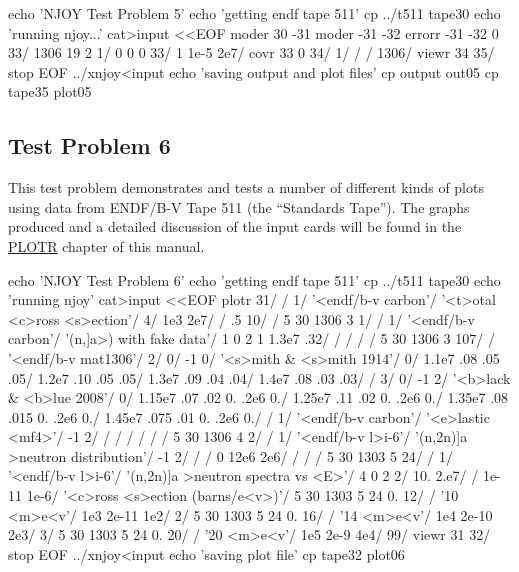 \small
\begin{ccode}

echo 'NJOY Test Problem 5'
echo 'getting endf tape 511'
cp ../t511 tape30
echo 'running njoy...'
cat>input <<EOF
 moder
 30 -31
 moder
 -31 -32
 errorr
 -31 -32 0 33/
 1306 19 2 1/
 0 0
 0 33/
 1
 1e-5 2e7/
 covr
 33 0 34/
 1/
 /
 /
 1306/
 viewr
 34 35/
 stop
EOF
../xnjoy<input
echo 'saving output and plot files'
cp output out05
cp tape35 plot05

\end{ccode}
\normalsize

\subsection{Test Problem 6}
\label{ssMandT_6}

This test problem demonstrates and tests a number of different
kinds of plots using data from ENDF/B-V Tape 511
(the ``Standards Tape'').  The graphs produced and a detailed
discussion of the input cards will be found in the
\hyperlink{sPLOTRhy}{PLOTR}
chapter of this manual.

\small
\begin{ccode}

echo 'NJOY Test Problem 6'
echo 'getting endf tape 511'
cp ../t511 tape30
echo 'running njoy'
cat>input <<EOF
 plotr
 31/
 /
 1/
 '<endf/b-v carbon'/
 '<t>otal <c>ross <s>ection'/
 4/
 1e3 2e7/
 /
 .5 10/
 /
 5 30 1306 3 1/
 /
 1/
 '<endf/b-v carbon'/
 '(n,]a>) with fake data'/
 1 0 2 1 1.3e7 .32/
 /
 /
 /
 /
 5 30 1306 3 107/
 /
 '<endf/b-v mat1306'/
 2/
 0/
 -1 0/
 '<s>mith & <s>mith 1914'/
 0/
 1.1e7 .08 .05 .05/
 1.2e7 .10 .05 .05/
 1.3e7 .09 .04 .04/
 1.4e7 .08 .03 .03/
 /
 3/
 0/
 -1 2/
 '<b>lack & <b>lue 2008'/
 0/
 1.15e7 .07 .02 0. .2e6 0./
 1.25e7 .11 .02 0. .2e6 0./
 1.35e7 .08 .015 0. .2e6 0./
 1.45e7 .075 .01 0. .2e6 0./
 /
 1/
 '<endf/b-v carbon'/
 '<e>lastic <mf4>'/
 -1 2/
 /
 /
 /
 /
 /
 /
 5 30 1306 4 2/
 /
 1/
 '<endf/b-v l>i-6'/
 '(n,2n)]a >neutron distribution'/
 -1 2/
 /
 /
 0 12e6 2e6/
 /
 /
 /
 5 30 1303 5 24/
 /
 1/
 '<endf/b-v l>i-6'/
 '(n,2n)]a >neutron spectra vs <E>'/
 4 0 2 2/
 10. 2.e7/
 /
 1e-11 1e-6/
 '<c>ross <s>ection (barns/e<v>)'/
 5 30 1303 5 24 0. 12/
 /
 '10 <m>e<v'/
 1e3 2e-11 1e2/
 2/
 5 30 1303 5 24 0. 16/
 /
 '14 <m>e<v'/
 1e4 2e-10 2e3/
 3/
 5 30 1303 5 24 0. 20/
 /
 '20 <m>e<v'/
 1e5 2e-9 4e4/
 99/
 viewr
 31 32/
 stop
EOF
../xnjoy<input
echo 'saving plot file'
cp tape32 plot06

\end{ccode}
\normalsize

